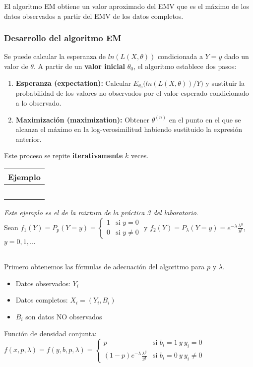El algoritmo EM obtiene un valor aproximado del EMV que es el máximo de los datos observados a partir del EMV de los datos completos.

\subsubsection{Desarrollo del algoritmo EM}
Se puede calcular la esperanza de $ln(L(X,\theta))$ condicionada a $Y=y$ dado un valor de $\theta$. A partir de un \textbf{valor inicial} $\theta_0$, el algoritmo establece dos pasos:
\begin{enumerate}
    \item \textbf{Esperanza (expectation):} Calcular $E_{\theta_0}\Big(ln(L(X,\theta))\big/Y\Big)$ y sustituir la probabilidad de los valores no observados por el valor esperado condicionado a lo observado.
    \item \textbf{Maximización (maximization):} Obtener $\theta^{(n)}$ en el punto en el que se alcanza el máximo en la log-verosimilitud habiendo sustituido la expresión anterior.
\end{enumerate} 
Este proceso se repite \textbf{iterativamente} $k$ veces. 

\hspace{-1cm}\noindent\begin{tabular}{r}
    \textbf{Ejemplo}  \\ \hline \ \\
\end{tabular}

\textit{Este ejemplo es el de la mixtura de la práctica 3 del laboratorio}.\\
Sean $f_1(Y)=P_p(Y=y)=\begin{cases}
    1 & \text{si } y=0 \\
    0 & \text{si } y \neq 0
\end{cases}$ y $f_2(Y)=P_\lambda(Y=y)=e^{-\lambda}\frac{\lambda^y}{y!}$, $y=0,1,...$

\ \\
Primero obtenemos las fórmulas de adecuación del algoritmo para $p$ y $\lambda$.
\begin{itemize}
    \item Datos observados: $Y_i$
    \item Datos completos: $X_i=(Y_i,B_i)$
    \item $B_i$ son datos NO observados
\end{itemize}
Función de densidad conjunta: $ f(x,p,\lambda)=f(y,b,p,\lambda)=\begin{cases}
    p & \text{si } b_i=1\ y\ y_i=0 \\
    (1-p)e^{-\lambda}\frac{\lambda^y}{y!} & \text{si } b_i=0\ y\ y_i \neq 0
\end{cases} $

